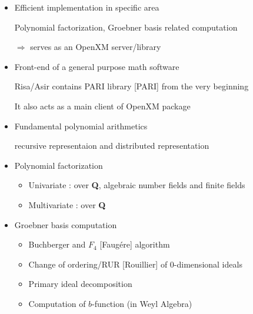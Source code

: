 \begin{slide}{}

\begin{itemize}
\item Efficient implementation in specific area

Polynomial factorization, Groebner basis related computation

$\Rightarrow$ serves as an OpenXM server/library

\item Front-end of a general purpose math software

Risa/Asir contains PARI library [PARI] from the very beginning

It also acts as a main client of OpenXM package

\end{itemize}
\end{slide}

\begin{slide}{}

\begin{itemize}
\item Fundamental polynomial arithmetics

recursive representaion and distributed representation

\item Polynomial factorization

\begin{itemize}
\item Univariate : over {\bf Q}, algebraic number fields and finite fields

\item Multivariate : over {\bf Q}
\end{itemize}

\item Groebner basis computation

\begin{itemize}
\item Buchberger and $F_4$ [Faug\'ere] algorithm

\item Change of ordering/RUR [Rouillier] of 0-dimensional ideals

\item Primary ideal decomposition

\item Computation of $b$-function (in Weyl Algebra)
\end{itemize}
\end{itemize}
\end{slide}

